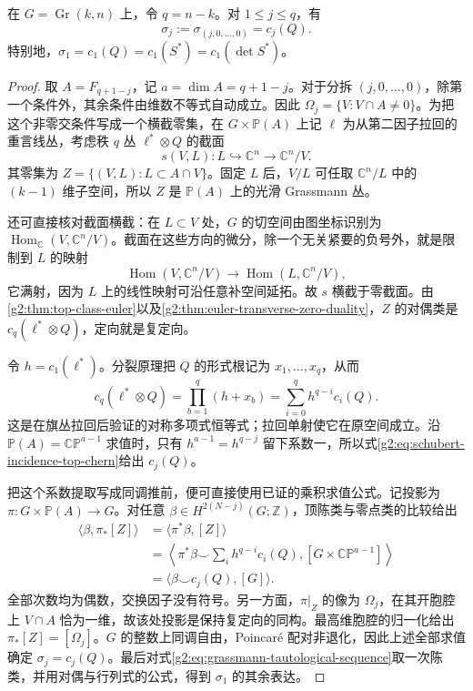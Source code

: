 \begin{theorem}\label{g2:thm:special-schubert-chern}
	在 \(G=\operatorname{Gr}(k,n)\) 上，令 \(q=n-k\)。对 \(1\le j\le q\)，有
	\begin{equation}\label{g2:eq:special-schubert-quotient}
		\sigma_j:=\sigma_{(j,0,\ldots,0)}=c_j(Q).
	\end{equation}
	特别地，\(\sigma_1=c_1(Q)=c_1(S^*)=c_1(\det S^*)\)。
\end{theorem}
\begin{proof}
	取 \(A=F_{q+1-j}\)，记 \(a=\dim A=q+1-j\)。对于分拆 \((j,0,\ldots,0)\)，除第一个条件外，其余条件由维数不等式自动成立。因此 \(\Omega_j=\{V:V\cap A\ne0\}\)。为把这个非零交条件写成一个横截零集，在 \(G\times\mathbb P(A)\) 上记 \(\ell\) 为从第二因子拉回的重言线丛，考虑秩 \(q\) 丛 \(\ell^*\otimes Q\) 的截面
	\[
		s(V,L):L\hookrightarrow\mathbb C^n\longrightarrow\mathbb C^n/V.
	\]
	其零集为 \(Z=\{(V,L):L\subset A\cap V\}\)。固定 \(L\) 后，\(V/L\) 可任取 \(\mathbb C^n/L\) 中的 \((k-1)\) 维子空间，所以 \(Z\) 是 \(\mathbb P(A)\) 上的光滑 Grassmann 丛。

	还可直接核对截面横截：在 \(L\subset V\) 处，\(G\) 的切空间由图坐标识别为 \(\operatorname{Hom}_{\mathbb C}(V,\mathbb C^n/V)\)。截面在这些方向的微分，除一个无关紧要的负号外，就是限制到 \(L\) 的映射
	\[
		\operatorname{Hom}(V,\mathbb C^n/V)\longrightarrow\operatorname{Hom}(L,\mathbb C^n/V),
	\]
	它满射，因为 \(L\) 上的线性映射可沿任意补空间延拓。故 \(s\) 横截于零截面。由\cref{g2:thm:top-class-euler}以及\cref{g2:thm:euler-transverse-zero-duality}，\(Z\) 的对偶类是 \(c_q(\ell^*\otimes Q)\)，定向就是复定向。

	令 \(h=c_1(\ell^*)\)。分裂原理把 \(Q\) 的形式根记为 \(x_1,\ldots,x_q\)，从而
	\begin{equation}\label{g2:eq:schubert-incidence-top-chern}
		c_q(\ell^*\otimes Q)=\prod_{b=1}^q(h+x_b)
		=\sum_{i=0}^q h^{q-i}c_i(Q).
	\end{equation}
	这是在旗丛拉回后验证的对称多项式恒等式；拉回单射使它在原空间成立。沿 \(\mathbb P(A)=\mathbb{CP}^{a-1}\) 求值时，只有 \(h^{a-1}=h^{q-j}\) 留下系数一，所以式\eqref{g2:eq:schubert-incidence-top-chern}给出 \(c_j(Q)\)。

	把这个系数提取写成同调推前，便可直接使用已证的乘积求值公式。记投影为 \(\pi:G\times\mathbb P(A)\to G\)。对任意 \(\beta\in H^{2(N-j)}(G;\mathbb Z)\)，顶陈类与零点类的比较给出
	\[
	\begin{aligned}
		\langle\beta,\pi_*[Z]\rangle
		&=\langle\pi^*\beta,[Z]\rangle\\
		&=\left\langle\pi^*\beta\smile\sum_i h^{q-i}c_i(Q),[G\times\mathbb{CP}^{a-1}]\right\rangle\\
		&=\langle\beta\smile c_j(Q),[G]\rangle.
	\end{aligned}
	\]
	全部次数均为偶数，交换因子没有符号。另一方面，\(\pi|_Z\) 的像为 \(\Omega_j\)，在其开胞腔上 \(V\cap A\) 恰为一维，故该处投影是保持复定向的同构。最高维胞腔的归一化给出 \(\pi_*[Z]=[\Omega_j]\)。\(G\) 的整数上同调自由，Poincar\'e 配对非退化，因此上述全部求值确定 \(\sigma_j=c_j(Q)\)。最后对式\eqref{g2:eq:grassmann-tautological-sequence}取一次陈类，并用对偶与行列式的公式，得到 \(\sigma_1\) 的其余表达。
\end{proof}

